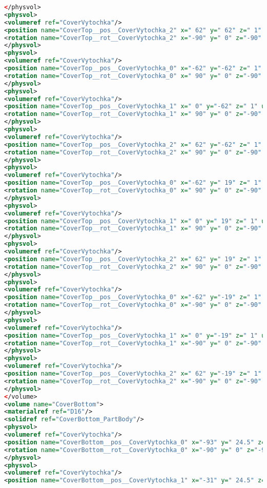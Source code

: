 \begin{lstlisting}[language=XML, firstline=1, lastline=89]
</physvol>
<physvol>
<volumeref ref="CoverVytochka"/>
<position name="CoverTop__pos__CoverVytochka_2" x=" 62" y=" 62" z=" 1" unit="mm"/>
<rotation name="CoverTop__rot__CoverVytochka_2" x="-90" y=" 0" z="-90" unit="deg"/>
</physvol>
<physvol>
<volumeref ref="CoverVytochka"/>
<position name="CoverTop__pos__CoverVytochka_0" x="-62" y="-62" z=" 1" unit="mm"/>
<rotation name="CoverTop__rot__CoverVytochka_0" x=" 90" y=" 0" z="-90" unit="deg"/>
</physvol>
<physvol>
<volumeref ref="CoverVytochka"/>
<position name="CoverTop__pos__CoverVytochka_1" x=" 0" y="-62" z=" 1" unit="mm"/>
<rotation name="CoverTop__rot__CoverVytochka_1" x=" 90" y=" 0" z="-90" unit="deg"/>
</physvol>
<physvol>
<volumeref ref="CoverVytochka"/>
<position name="CoverTop__pos__CoverVytochka_2" x=" 62" y="-62" z=" 1" unit="mm"/>
<rotation name="CoverTop__rot__CoverVytochka_2" x=" 90" y=" 0" z="-90" unit="deg"/>
</physvol>
<physvol>
<volumeref ref="CoverVytochka"/>
<position name="CoverTop__pos__CoverVytochka_0" x="-62" y=" 19" z=" 1" unit="mm"/>
<rotation name="CoverTop__rot__CoverVytochka_0" x=" 90" y=" 0" z="-90" unit="deg"/>
</physvol>
<physvol>
<volumeref ref="CoverVytochka"/>
<position name="CoverTop__pos__CoverVytochka_1" x=" 0" y=" 19" z=" 1" unit="mm"/>
<rotation name="CoverTop__rot__CoverVytochka_1" x=" 90" y=" 0" z="-90" unit="deg"/>
</physvol>
<physvol>
<volumeref ref="CoverVytochka"/>
<position name="CoverTop__pos__CoverVytochka_2" x=" 62" y=" 19" z=" 1" unit="mm"/>
<rotation name="CoverTop__rot__CoverVytochka_2" x=" 90" y=" 0" z="-90" unit="deg"/>
</physvol>
<physvol>
<volumeref ref="CoverVytochka"/>
<position name="CoverTop__pos__CoverVytochka_0" x="-62" y="-19" z=" 1" unit="mm"/>
<rotation name="CoverTop__rot__CoverVytochka_0" x="-90" y=" 0" z="-90" unit="deg"/>
</physvol>
<physvol>
<volumeref ref="CoverVytochka"/>
<position name="CoverTop__pos__CoverVytochka_1" x=" 0" y="-19" z=" 1" unit="mm"/>
<rotation name="CoverTop__rot__CoverVytochka_1" x="-90" y=" 0" z="-90" unit="deg"/>
</physvol>
<physvol>
<volumeref ref="CoverVytochka"/>
<position name="CoverTop__pos__CoverVytochka_2" x=" 62" y="-19" z=" 1" unit="mm"/>
<rotation name="CoverTop__rot__CoverVytochka_2" x="-90" y=" 0" z="-90" unit="deg"/>
</physvol>
</volume>
<volume name="CoverBottom">
<materialref ref="D16"/>
<solidref ref="CoverBottom_PartBody"/>
<physvol>
<volumeref ref="CoverVytochka"/>
<position name="CoverBottom__pos__CoverVytochka_0" x="-93" y=" 24.5" z=" 1" unit="mm"/>
<rotation name="CoverBottom__rot__CoverVytochka_0" x="-90" y=" 0" z="-90" unit="deg"/>
</physvol>
<physvol>
<volumeref ref="CoverVytochka"/>
<position name="CoverBottom__pos__CoverVytochka_1" x="-31" y=" 24.5" z=" 1" unit="mm"/>

\end{lstlisting}
